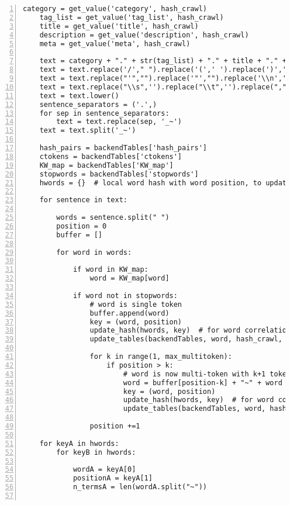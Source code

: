 \documentclass[10pt]{article}
\begin{document}
{\begin{lstlisting}[numbers=left,basicstyle=\ttfamily\footnotesize]
    category = get_value('category', hash_crawl)
    tag_list = get_value('tag_list', hash_crawl)
    title = get_value('title', hash_crawl)
    description = get_value('description', hash_crawl)
    meta = get_value('meta', hash_crawl)

    text = category + "." + str(tag_list) + "." + title + "." + description + "." + meta
    text = text.replace('/'," ").replace('(',' ').replace(')',' ').replace('?','')
    text = text.replace("'","").replace('"',"").replace('\\n','').replace('!','')
    text = text.replace("\\s",'').replace("\\t",'').replace(","," ").replace(":"," ")  
    text = text.lower() 
    sentence_separators = ('.',)
    for sep in sentence_separators:
        text = text.replace(sep, '_~')
    text = text.split('_~') 

    hash_pairs = backendTables['hash_pairs']
    ctokens = backendTables['ctokens']
    KW_map = backendTables['KW_map']
    stopwords = backendTables['stopwords']
    hwords = {}  # local word hash with word position, to update hash_pairs

    for sentence in text:

        words = sentence.split(" ")
        position = 0
        buffer = []

        for word in words:

            if word in KW_map: 
                word = KW_map[word] 

            if word not in stopwords: 
                # word is single token
                buffer.append(word)
                key = (word, position)
                update_hash(hwords, key)  # for word correlation table (hash_pairs)
                update_tables(backendTables, word, hash_crawl, backendParams)

                for k in range(1, max_multitoken):
                    if position > k:
                        # word is now multi-token with k+1 tokens
                        word = buffer[position-k] + "~" + word 
                        key = (word, position)
                        update_hash(hwords, key)  # for word correlation table (hash_pairs)
                        update_tables(backendTables, word, hash_crawl, backendParams)

                position +=1     

    for keyA in hwords:
        for keyB in hwords:

            wordA = keyA[0]
            positionA = keyA[1]
            n_termsA = len(wordA.split("~"))


\end{lstlisting}}
\end{document}
